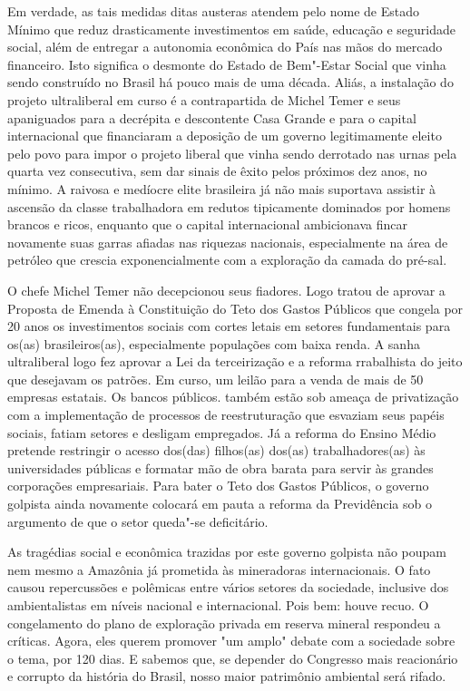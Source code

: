 Em verdade, as tais medidas ditas austeras atendem pelo nome de Estado
Mínimo que reduz drasticamente investimentos em saúde, educação e
seguridade social, além de entregar a autonomia econômica do País nas
mãos do mercado financeiro. Isto significa o desmonte do Estado de
Bem"-Estar Social que vinha sendo construído no Brasil há pouco mais de
uma década. Aliás, a instalação do projeto ultraliberal em curso é a
contrapartida de Michel Temer e seus apaniguados para a decrépita e
descontente Casa Grande e para o capital internacional que financiaram a
deposição de um governo legitimamente eleito pelo povo para impor o
projeto liberal que vinha sendo derrotado nas urnas pela quarta vez
consecutiva, sem dar sinais de êxito pelos próximos dez anos, no mínimo.
A raivosa e medíocre elite brasileira já não mais suportava assistir à
ascensão da classe trabalhadora em redutos tipicamente dominados por
homens brancos e ricos, enquanto que o capital internacional ambicionava
fincar novamente suas garras afiadas nas riquezas nacionais,
especialmente na área de petróleo que crescia exponencialmente com a
exploração da camada do pré-sal.

O chefe Michel Temer não decepcionou seus fiadores. Logo tratou de
aprovar a Proposta de Emenda à Constituição do Teto dos Gastos Públicos
que congela por 20 anos os investimentos sociais com cortes letais em
setores fundamentais para os(as) brasileiros(as), especialmente
populações com baixa renda. A sanha ultraliberal logo fez aprovar a Lei
da terceirização e a reforma rrabalhista do jeito que desejavam os
patrões. Em curso, um leilão para a venda de mais de 50 empresas
estatais. Os bancos públicos. também estão sob ameaça de privatização
com a implementação de processos de reestruturação que esvaziam seus
papéis sociais, fatiam setores e desligam empregados. Já a reforma do
Ensino Médio pretende restringir o acesso dos(das) filhos(as) dos(as)
trabalhadores(as) às universidades públicas e formatar mão de obra
barata para servir às grandes corporações empresariais. Para bater o
Teto dos Gastos Públicos, o governo golpista ainda novamente colocará em
pauta a reforma da Previdência sob o argumento de que o setor queda"-se
deficitário.

As tragédias social e econômica trazidas por este governo golpista não
poupam nem mesmo a Amazônia já prometida às mineradoras internacionais.
O fato causou repercussões e polêmicas entre vários setores da
sociedade, inclusive dos ambientalistas em níveis nacional e
internacional. Pois bem: houve recuo. O congelamento do plano de
exploração privada em reserva mineral respondeu a críticas. Agora, eles
querem promover "um amplo" debate com a sociedade sobre o tema, por 120
dias. E sabemos que, se depender do Congresso mais reacionário e
corrupto da história do Brasil, nosso maior patrimônio ambiental será
rifado.

